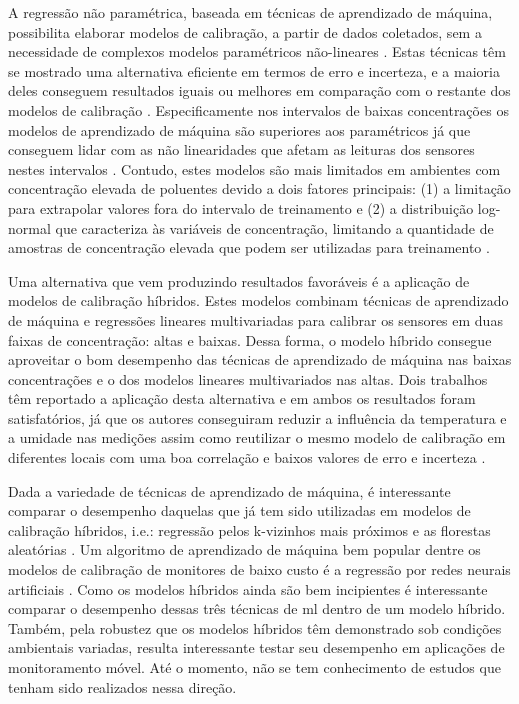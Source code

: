 A regressão não paramétrica, baseada em técnicas de aprendizado de máquina, possibilita elaborar modelos de calibração, a partir de dados coletados, sem a necessidade de complexos modelos paramétricos não-lineares \cite{Maag2018ADeployments}. Estas técnicas têm se mostrado uma alternativa eficiente em termos de erro e incerteza, e a maioria deles conseguem resultados iguais ou melhores em comparação com o restante dos modelos de calibração \cite{Feng2019ReviewTechnology}. Especificamente nos intervalos de baixas concentrações os modelos de aprendizado de máquina são superiores aos paramétricos já que conseguem lidar com as não linearidades que afetam as leituras dos sensores nestes intervalos \cite{Malings2019DevelopmentMonitoring}. Contudo, estes modelos  são mais limitados em ambientes com concentração elevada de poluentes devido a dois fatores principais: (1) a limitação para extrapolar valores fora do intervalo de treinamento \cite{Hagan2018CalibrationInstruments} e (2) a distribuição log-normal que caracteriza às variáveis de concentração, limitando a quantidade de amostras de concentração elevada que podem ser utilizadas para treinamento \cite{Zimmerman2018AMonitoring}.

Uma alternativa que vem produzindo resultados favoráveis é a aplicação de modelos de calibração híbridos. Estes modelos combinam técnicas de aprendizado de máquina e regressões lineares multivariadas para calibrar os sensores em duas faixas de concentração: altas e baixas. Dessa forma, o modelo híbrido consegue aproveitar o bom desempenho das técnicas de aprendizado de máquina nas baixas concentrações e o dos modelos lineares multivariados nas altas. Dois trabalhos têm reportado a aplicação desta alternativa e em ambos os resultados foram satisfatórios, já que os autores conseguiram reduzir a influência da temperatura e a umidade nas medições assim como reutilizar o mesmo modelo de calibração em diferentes locais com uma boa correlação e baixos valores de erro e incerteza \cite{Hagan2018CalibrationInstruments,Malings2019DevelopmentMonitoring}.

Dada a variedade de técnicas de aprendizado de máquina, é interessante comparar o desempenho daquelas que já tem sido utilizadas em modelos de calibração híbridos, i.e.: regressão pelos k-vizinhos mais próximos \cite{Hagan2018CalibrationInstruments} e as florestas aleatórias \cite{Malings2019DevelopmentMonitoring}. Um algoritmo de aprendizado de máquina bem popular \cite{Feng2019ReviewTechnology} dentre os modelos de calibração de monitores de baixo custo é a regressão por redes neurais artificiais \cite{Concas2019ACalibration}. Como os modelos híbridos ainda são bem incipientes é interessante comparar o desempenho dessas três técnicas de \gls{ml} dentro de um modelo híbrido. Também, pela robustez que os modelos híbridos têm demonstrado sob condições ambientais variadas, resulta interessante testar seu desempenho em aplicações de monitoramento móvel. Até o momento, não se tem conhecimento de estudos que tenham sido realizados nessa direção.


